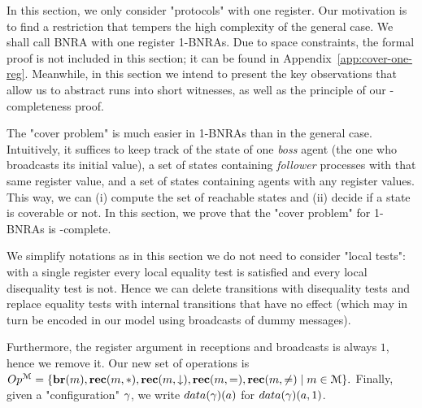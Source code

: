 	In this section, we only consider "protocols" with one register. Our motivation is to find a restriction that tempers the high complexity of the general case. We shall call BNRA with one register 1-BNRAs. Due to space constraints, the formal proof is not included in this section; it can be found in Appendix~\ref{app:cover-one-reg}. Meanwhile, in this section we intend to present the key observations that allow us to abstract runs into short witnesses, as well as the principle of our \NP-completeness proof.
	
	The "cover problem" is much easier in 1-BNRAs than in the general case. Intuitively, it suffices to keep track of the state of one \emph{boss} agent (the one who broadcasts its initial value), a set of states containing \emph{follower} processes with that same register value, and a set of states containing agents with any register values. This way, we can (i) compute the set of reachable states and (ii) decide if a state is coverable or not. In this section, we prove that the "cover problem" for 1-BNRAs is \NP-complete.

	We simplify notations as in this section we do not need to consider "local tests": with a single register every local equality test is satisfied and every local disequality test is not.
	Hence we can delete transitions with disequality tests and replace equality tests with internal transitions that have no effect (which may in turn be encoded in our model using broadcasts of dummy messages). 
	 
	Furthermore, the register argument in receptions and broadcasts is always $1$, hence we remove it.
	Our new set of operations is 
	$
	Op^{\mathcal{M}} = \{\textbf{br}(m), \textbf{rec}(m, {*}), \textbf{rec}(m, \downarrow), \textbf{rec}(m, {=}), \textbf{rec}(m, {\ne}) \mid m \in \mathcal{M}\}.
	$
	Finally, given a "configuration" $\gamma$, we write $\data{\config}(a)$ for $\data{\config}(a,1)$. 

		



